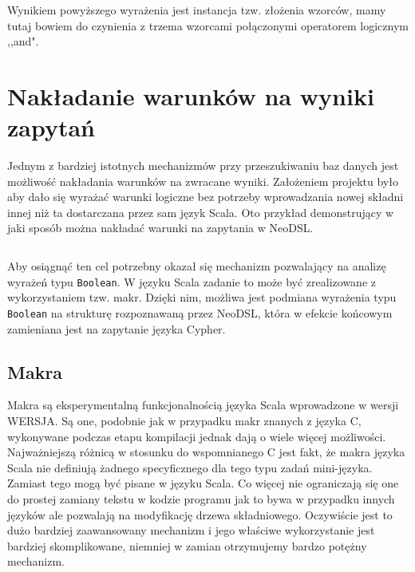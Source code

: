 \documentclass[brudnopis]{xmgr}
\begin{document}
Wynikiem powyższego wyrażenia jest instancja tzw. złożenia wzorców, mamy tutaj bowiem do czynienia z trzema wzorcami połączonymi operatorem logicznym ,,and". 

\section{Nakładanie warunków na wyniki zapytań}

Jednym z bardziej istotnych mechanizmów przy przeszukiwaniu baz danych jest możliwość nakładania warunków na zwracane wyniki. Założeniem projektu było aby dało się wyrażać warunki logiczne bez potrzeby wprowadzania nowej składni innej niż ta dostarczana przez sam język Scala. Oto przykład demonstrujący w jaki sposób można nakładać warunki na zapytania w NeoDSL.

\inputminted{scala}{listings/scala/dsl/query-with-simple-condition.scala}

Aby osiągnąć ten cel potrzebny okazał się mechanizm pozwalający na analizę wyrażeń typu \texttt{Boolean}. W języku Scala zadanie to może być zrealizowane z wykorzystaniem tzw. makr. 
Dzięki nim, możliwa jest podmiana wyrażenia typu \texttt{Boolean} na strukturę rozpoznawaną przez NeoDSL, która w efekcie końcowym zamieniana jest na zapytanie języka Cypher.

\subsection{Makra}

Makra są eksperymentalną funkcjonalnością języka Scala wprowadzone w wersji WERSJA. Są one, podobnie jak w przypadku makr znanych z języka C, wykonywane podczas etapu kompilacji jednak dają o wiele więcej możliwości. Najważniejszą różnicą w stosunku do wspomnianego C jest fakt, że makra języka Scala nie definiują żadnego specyficznego dla tego typu zadań mini-języka. Zamiast tego mogą być pisane w języku Scala. Co więcej nie ograniczają się one do prostej zamiany tekstu w kodzie programu jak to bywa w przypadku innych języków ale pozwalają na modyfikację drzewa składniowego. Oczywiście jest to dużo bardziej zaawansowany mechanizm i jego właściwe wykorzystanie jest bardziej skomplikowane, niemniej w zamian otrzymujemy bardzo potężny mechanizm.
\end{document}

